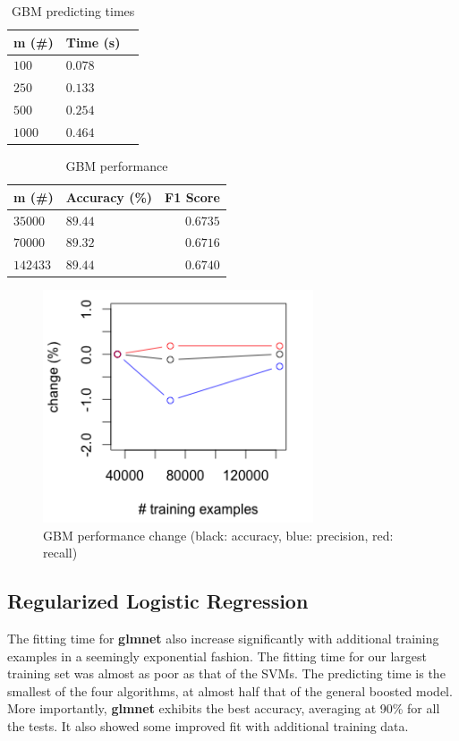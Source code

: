 \documentclass[twoside]{article}
\begin{document}
\begin{multicols}{2}
\begin{table}[H]
\caption{GBM predicting times}
\centering
\begin{tabular}{llr}
\toprule
m (\#) & Time (s) \\
\midrule
$100$ & $0.078$ \\
$250$ & $0.133$ \\
$500$ & $0.254$ \\
$1000$ & $0.464$ \\
\bottomrule
\end{tabular}
\end{table}

\begin{table}[H]
\caption{GBM performance}
\centering
\begin{tabular}{llr}
\toprule
m (\#) & Accuracy (\%) & F1 Score \\
\midrule
$35000$ & $89.44$ & $0.6735$ \\
$70000$ & $89.32$ & $0.6716$ \\
$142433$ & $89.44$ & $0.6740$ \\
\bottomrule
\end{tabular}
\end{table}

\begin{figure}[H]
 \caption{GBM performance change (black: accuracy, blue: precision, red: recall)}
  \centering
    \includegraphics[width=8cm]{../data/gbm_change}
\end{figure}

\subsection{Regularized Logistic Regression}
The fitting time for \textbf{glmnet} also increase significantly with additional training examples in a seemingly exponential fashion. The fitting time for our largest training set was almost as poor as that of the SVMs. The predicting time is the smallest of the four algorithms, at almost half that of the general boosted model. More importantly, \textbf{glmnet} exhibits the best accuracy, averaging at 90\% for all the tests. It also showed some improved fit with additional training data.


\end{multicols}
\end{document}
